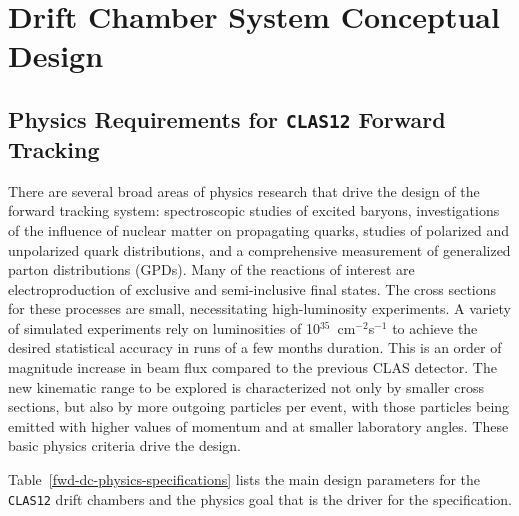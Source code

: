 \section{Drift Chamber System Conceptual Design}



\subsection{Physics Requirements for {\tt CLAS12} Forward Tracking}

There are several broad areas of physics research that drive 
the design of the forward tracking system: 
spectroscopic studies of excited baryons, investigations of 
the influence of nuclear matter on propagating quarks, studies of polarized 
and unpolarized quark distributions, and a comprehensive measurement of 
generalized parton distributions (GPDs).  Many of the reactions of interest 
are electroproduction of exclusive and semi-inclusive final states.  The 
cross sections for these processes are small, necessitating high-luminosity 
experiments.  A variety of simulated experiments rely on luminosities of 
10$^{35}$~cm$^{-2}$s$^{-1}$ to achieve the desired statistical accuracy in 
runs of a few months duration.  This is an order of magnitude increase
in beam flux compared to the previous CLAS detector.  
The new kinematic range to be explored is 
characterized not only by smaller cross sections, but also by more outgoing 
particles per event, with those particles being emitted with higher values 
of momentum and at smaller laboratory angles.  These basic physics criteria 
drive the design. 


Table~\ref{fwd-dc-physics-specifications} lists the main design parameters for 
the {\tt CLAS12} drift chambers and the physics goal that is the driver
for the specification.  

